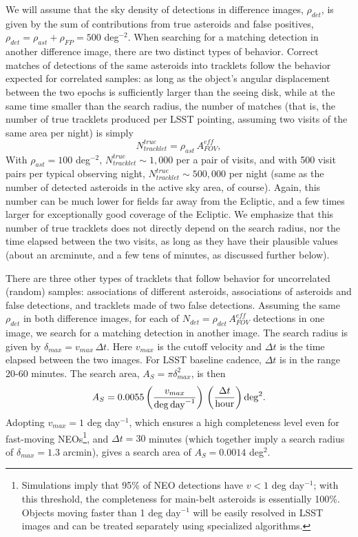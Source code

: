 We will assume that the sky density of detections in difference images, $\rho_{det}$, is given by 
the sum of contributions from true asteroids and false positives, $\rho_{det} = \rho_{ast} + \rho_{FP}
= 500$ deg$^{-2}$. When searching for a matching detection in another difference image, there are
two distinct types of behavior. Correct matches of detections of the same asteroids into tracklets follow the behavior 
expected for correlated samples: as long as the object's angular displacement between the two epochs 
is sufficiently larger than the seeing disk, while at the same time smaller than the search radius, the
number of matches (that is, the number of true tracklets produced per LSST pointing, assuming 
two visits of the same area per night) is simply 
\begin{equation}
                  N_{tracklet}^{true} = \rho_{ast}  \, A_{FOV}^{eff},
\end{equation}
With  $\rho_{ast} = 100$ deg$^{-2}$, $N_{tracklet}^{true} \sim 1,000$ per a pair of visits, and with
500 visit pairs per typical observing night, $N_{tracklet}^{true} \sim 500,000$ per night (same as 
the number of detected asteroids in the active sky area, of course). Again,
this number can be much lower for fields far away from the Ecliptic, and a few times larger
for exceptionally good coverage of the Ecliptic. We emphasize that this number of true tracklets 
does not directly depend on the search radius, nor the time elapsed between the two visits, as long 
as they have their plausible values (about an arcminute, and a few tens of minutes, as discussed 
further below). 

There are three other types of tracklets that follow behavior for uncorrelated (random) 
samples: associations of different asteroids, associations of asteroids and false detections, 
and tracklets made of two false detections. Assuming the same $\rho_{det}$ in both 
difference images, for each of $N_{det} = \rho_{det} \, A_{FOV}^{eff}$ detections in one image,
we search for a matching detection in another image. The search radius is given by 
$\delta_{max} = v_{max} \, \Delta t$. Here $v_{max}$ is the  cutoff velocity and $\Delta t$ 
is the time elapsed between the two images. For LSST baseline cadence, $\Delta t$ is in 
the range 20-60 minutes. The search area, $A_S = \pi \delta_{max}^2$, is then 
\begin{equation}
     A_S = 0.0055 \left( v_{max}  \over {\rm deg \, day}^{-1} \right) \, \left(\Delta t \over {\rm hour} \right) {\rm deg}^2.
\end{equation}
Adopting $v_{max} = 1$ deg day$^{-1}$, which ensures a high completeness level even for fast-moving 
NEOs\footnote{Simulations imply that 95\% of NEO detections have $v<1$ deg day$^{-1}$; with this threshold,
the completeness for main-belt asteroids is essentially 100\%. Objects moving faster than 1 deg day$^{-1}$ will
be easily resolved in LSST images and can be treated separately using specialized algorithms.}, and $\Delta t = 30$
minutes (which together 
imply a search radius of $\delta_{max} = 1.3$ arcmin), gives a search area of $A_S = 0.0014$ deg$^2$. 

